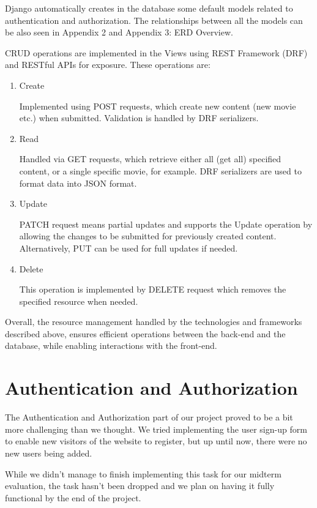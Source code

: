 \documentclass[letterpaper,twocolumn]{article}
\begin{document}
Django automatically creates in the database some default models related to authentication and authorization. The relationships between all the models can be also seen in Appendix 2 and Appendix 3: ERD Overview. 

CRUD operations are implemented in the Views using REST Framework (DRF) and RESTful APIs for exposure. These operations are: 

\begin{enumerate}
    \item Create

Implemented using POST requests, which create new content (new movie etc.) when submitted. Validation is handled by DRF serializers. 

    \item Read

Handled via GET requests, which retrieve either all (get all) specified content, or a single specific movie, for example. DRF serializers are used to format data into JSON format.

    \item Update

PATCH request means partial updates and supports the Update operation by allowing the changes to be submitted for previously created content. Alternatively, PUT can be used for full updates if needed. 

    \item Delete

This operation is implemented by DELETE request which removes the specified resource when needed. 

\end{enumerate}

Overall, the resource management handled by the technologies and frameworks described above, ensures efficient operations between the back-end and the database, while enabling interactions with the front-end. 

\section{Authentication and Authorization}

The Authentication and Authorization part of our project proved to be a bit more challenging than we thought. We tried implementing the user sign-up form to enable new visitors of the website to register, but up until now, there were no new users being added.

While we didn't manage to finish implementing this task for our midterm evaluation, the task hasn't been dropped and we plan on having it fully functional by the end of the project. 
\end{document}
